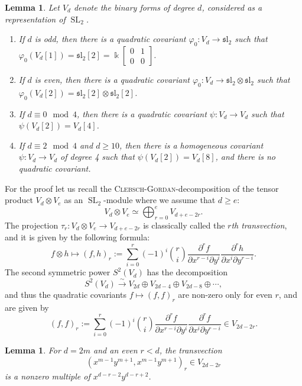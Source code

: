 \documentclass{amsart}
\newtheorem{lem}[thm]{Lemma}
\theoremstyle{definition}
\theoremstyle{remark}
\begin{document}
\begin{lem}\label{covariants.lem}
Let $V_{d}$ denote the binary forms of degree $d$, considered as a representation of ${\operatorname{SL}_{2}}$.
\begin{enumerate}
\item If $d$ is odd, then there is a quadratic covariant ${\varphi}_{0}\colon V_{d}\to\operatorname{{\mathfrak sl}_{2}}$ such that
${\varphi}_{0}(V_{d}[1]) = \operatorname{{\mathfrak sl}_{2}}[2]={\Bbbk}{\left[\begin{smallmatrix} 0 & 1 \\ 0 & 0\end{smallmatrix}\right]}$.
\item If $d$ is even, then there is a quadratic covariant ${\varphi}_{0}\colon V_{d} \to \operatorname{{\mathfrak sl}_{2}} \otimes \operatorname{{\mathfrak sl}_{2}}$ such that ${\varphi}_{0}(V_{d}[2]) = \operatorname{{\mathfrak sl}_{2}}[2]\otimes\operatorname{{\mathfrak sl}_{2}}[2]$.
\item  If $d\equiv 0\mod 4$, then there is a quadratic covariant $\psi\colon V_{d} \to V_{d}$ such that $\psi(V_{d}[2]) =V_{d}[4]$.
\item If  $d\equiv 2\mod 4$ and $d\geq 10$, then there is a homogeneous covariant $\psi\colon V_{d} \to V_{d}$ of degree 4 such that $\psi(V_{d}[2]) = V_{d}[8]$, and there is no quadratic covariant.
\end{enumerate}
\end{lem}

For the proof let us recall the {\textsc{{Clebsch-Gordan}\/}}-decomposition of the tensor product $V_{d}\otimes V_{e}$ as an ${\operatorname{SL}_{2}}$-module where we assume that $d \geq e$:
$$
V_{d}\otimes V_{e} \simeq \bigoplus_{r=0}^{e} V_{d+e-2r}.
$$
The projection $\tau_{r}\colon V_{d}\otimes V_{e} \to V_{d+e-2r}$ is classically called the {\it $r$th transvection}, and it is given by the following formula:
\[\tag{T1}\label{transvec1.form}
f\otimes h \mapsto (f,h)_{r} := \sum_{i=0}^{r}(-1)^{i}\binom{r}{i} \frac{\partial^{r}f}{\partial x^{r-i}
\partial y^{i}} \frac{\partial^{r}h}{\partial x^{i}\partial y^{r-i}}.
\]
The second symmetric power $S^{2}(V_{d})$ has the decomposition 
$$
S^{2}(V_{d}) {\xrightarrow{\sim}} V_{2d}\oplus V_{2d-4}\oplus V_{2d-8}\oplus \cdots,
$$
and thus the quadratic covariants $f\mapsto (f,f)_{r}$ are non-zero only for even $r$, and are given by
\[\tag{T2}\label{transvec2.form}
(f,f)_{r} := \sum_{i=0}^{r}(-1)^{i}\binom{r}{i} \frac{\partial^{r}f}{\partial x^{r-i}
\partial y^{i}} \frac{\partial^{r}f}{\partial x^{i}\partial y^{r-i}} \in V_{2d-2r}.
\]
\begin{lem}\label{nonzero-transvection.lem}
For $d =2m$ and an even $r < d$, the transvection
$$
(x^{m-1}y^{m+1},x^{m-1}y^{m+1})_{r} \in V_{2d-2r}
$$
is a nonzero multiple of $x^{d-r-2}y^{d-r+2}$.
\end{lem}
\end{document}
